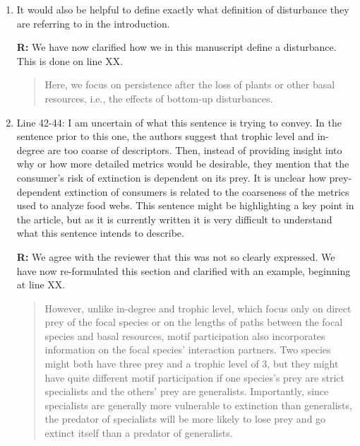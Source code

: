 \documentclass[12pt]{article}
\begin{document}
\begin{enumerate}
            \item It would also be helpful to define exactly what definition of disturbance they are referring to in the introduction.
            
             \textbf{R:}
             We have now clarified how we in this manuscript define a disturbance. This is done on line XX. 
             
             \begin{quotation}
             Here, we focus on persistence after the loss of plants or other basal resources, i.e., the effects of bottom-up disturbances.
            \end{quotation}

            \item Line 42-44: I am uncertain of what this sentence is trying to convey. In the sentence prior to this one, the authors suggest that trophic level and in-degree are too coarse of descriptors. Then, instead of providing insight into why or how more detailed metrics would be desirable, they mention that the consumer's risk of extinction is dependent on its prey. It is unclear how prey-dependent extinction of consumers is related to the coarseness of the metrics used to analyze food webs. This sentence might be highlighting a key point in the article, but as it is currently written it is very difficult to understand what this sentence intends to describe.

                \textbf{R:} We agree with the reviewer that this was not so clearly expressed. We have now re-formulated this section and clarified with an example, beginning at line XX. 
                
                \begin{quotation}
                However, unlike in-degree and trophic level, which focus only on direct prey of the focal species or on the lengths of paths between the focal species and basal resources, motif participation also incorporates information on the focal species' interaction partners. Two species might both have three prey and a trophic level of 3, but they might have quite different motif participation if one species's prey are strict specialists and the others' prey are generalists. Importantly, since specialists are generally more vulnerable to extinction than generalists, the predator of specialists will be more likely to lose prey and go extinct itself than a predator of generalists.
                \end{quotation}


\end{enumerate}
\end{document}

